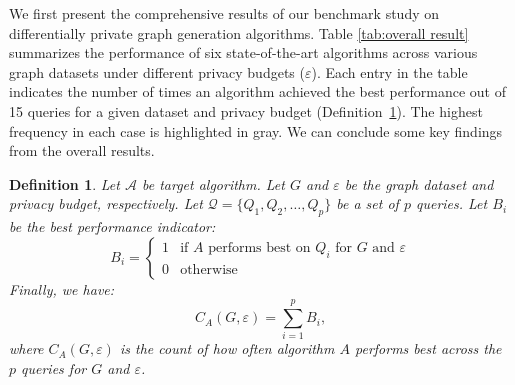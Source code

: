\documentclass[conference]{IEEEtran}
\theoremstyle{plain}
\newtheorem{definition}{Definition}
\begin{document}
We first present the comprehensive results of our benchmark study on differentially private graph generation algorithms. 
Table \ref{tab:overall result} summarizes the performance of six state-of-the-art algorithms across various graph datasets under different privacy budgets ($\varepsilon$). 
Each entry in the table indicates the number of times an algorithm achieved the best performance out of 15 queries for a given dataset and privacy budget (Definition~\ref{def:overall metric}). 
The highest frequency in each case is highlighted in gray.
We can conclude some key findings from the overall results.

\begin{definition}
\label{def:overall metric}
Let $\mathcal{A}$ be target algorithm.
Let $G$ and $\varepsilon$ be the graph dataset and privacy budget, respectively.
Let \(\mathcal{Q} = \{Q_1, Q_2, \ldots, Q_{p}\}\) be a set of $p$ queries. 
Let \( B_{i} \)  be the best performance indicator:
   \[
   B_{i} = 
   \begin{cases} 
   1 & \text{if } A \text{ performs best on } Q_i \text{ for } G \text{ and } \varepsilon \\
   0 & \text{otherwise}
   \end{cases}
   \]
Finally, we have:
   \[
   C_A(G,\varepsilon) = \sum_{i=1}^{p} B_{i},
   \]
where \( C_A(G,\varepsilon)  \) is the count of how often algorithm \( A \) performs best across the $p$ queries for \( G \) and \(\varepsilon\).
\end{definition}

\end{document}
